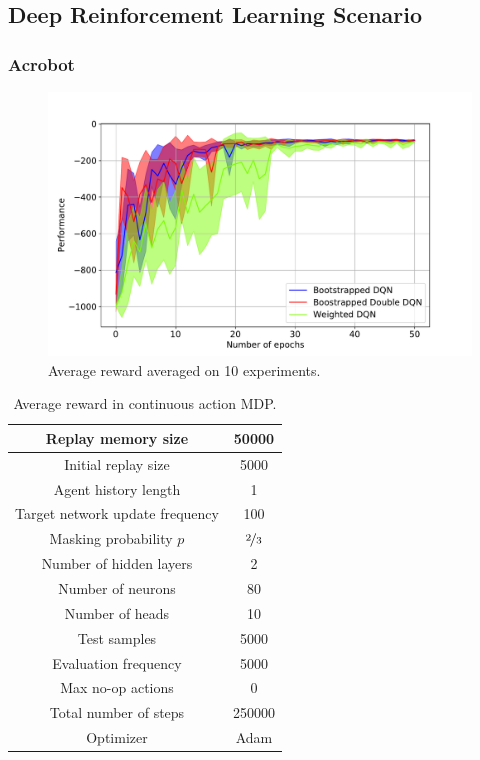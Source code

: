\subsection{Deep Reinforcement Learning Scenario}
\subsubsection{Acrobot}
\begin{figure}[t]
  \centering
  \includegraphics[scale=.6]{./img/acrobot.pdf}
  \caption{Average reward averaged on 10 experiments.
  }
  \label{F:acrobot}
\end{figure}
\begin{table}[t]
 \centering
 \caption{Average reward in continuous action MDP.}
 \label{T:acrobot_pars}
\begin{small}
\setlength{\tabcolsep}{4pt}
 \begin{tabular}{|c|c|}
\hline
Replay memory size & 50000\\
\hline
Initial replay size & 5000\\
\hline
Agent history length & 1\\
\hline
Target network update frequency & 100\\
\hline
Masking probability $p$ & $\nicefrac{2}{3}$\\
\hline
Number of hidden layers & 2\\
\hline
Number of neurons & 80\\
\hline
Number of heads & 10\\
\hline
Test samples & 5000\\
\hline
Evaluation frequency & 5000\\
\hline
Max no-op actions & 0\\
\hline
Total number of steps & 250000\\
\hline
Optimizer & Adam\\
\hline
 \end{tabular}
 \end{small}
\end{table}


